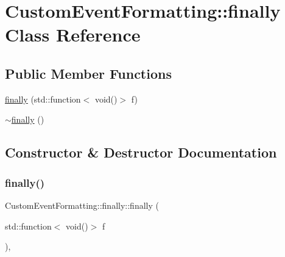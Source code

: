 \hypertarget{classCustomEventFormatting_1_1finally}{}\section{Custom\+Event\+Formatting\+::finally Class Reference}
\label{classCustomEventFormatting_1_1finally}
\subsection*{Public Member Functions}
\begin{DoxyCompactItemize}
\item 
\mbox{\hyperlink{classCustomEventFormatting_1_1finally_a090d090a293a86e33c89ad5c4b00ab3a}{finally}} (std\+::function$<$ void()$>$ f)
\item 
\mbox{\hyperlink{classCustomEventFormatting_1_1finally_a4d5ad4a2c512086d239a46ec68ed15c6}{$\sim$finally}} ()
\end{DoxyCompactItemize}


\subsection{Constructor \& Destructor Documentation}
\mbox{\label{classCustomEventFormatting_1_1finally_a090d090a293a86e33c89ad5c4b00ab3a}} 
\subsubsection{\texorpdfstring{finally()}{finally()}}
{\footnotesize\ttfamily Custom\+Event\+Formatting\+::finally\+::finally (\begin{DoxyParamCaption}\item[{std\+::function$<$ void()$>$}]{f }\end{DoxyParamCaption})\hspace{0.3cm}{\ttfamily [inline]}, {\ttfamily [explicit]}}

\mbox{\label{classCustomEventFormatting_1_1finally_a4d5ad4a2c512086d239a46ec68ed15c6}} 
